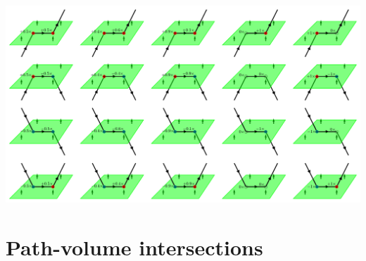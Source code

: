 %
%
%
%

\begin{center}
\includegraphics[width = \textwidth]{Intersections/Path-surface_intersections/path_surface_intersection_generalized_boundary_case}
\end{center}






\section{Path-volume intersections}

